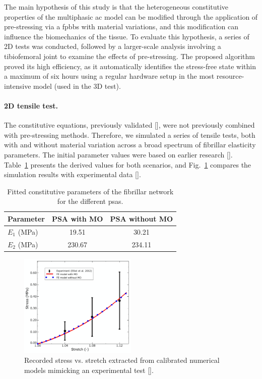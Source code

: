 \documentclass[12pt,a4paper]{report}
\begin{document}
The main hypothesis of this study is that the heterogeneous constitutive properties of the multiphasic \ac{ac} model can be modified through the application of  pre-stressing via a \ac{fpbbs} with material variations, and this modification can influence the biomechanics of the tissue. To evaluate this hypothesis, a series of 2D tests was conducted, followed by a larger-scale analysis involving a tibiofemoral joint to examine the effects of pre-stressing. The proposed algorithm proved its high efficiency, as it automatically identifies the stress-free state within a maximum of six hours using a regular hardware setup in the most resource-intensive model (used in the 3D test).

\paragraph{2D tensile test.} The constitutive equations, previously validated [\cite{sajjadinia2019}], were not previously combined with pre-stressing methods. Therefore, we simulated a series of tensile tests, both with and without material variation across a broad spectrum of fibrillar elasticity parameters. The initial parameter values were based on earlier research [\cite{wilson2007}]. Table~\ref{table:calibraion} presents the derived values for both scenarios, and Fig.~\ref{fig:calibration} compares the simulation results with experimental data [\cite{elliott2002}].
%
\begin{table}\centering
\caption{Fitted constitutive parameters of the fibrillar network for the different \acp{psa}.}
\label{table:calibraion}
\begin{tabular}{lcc}
\hline
\textbf{Parameter}  
& \textbf{PSA with MO}
& \textbf{PSA without MO}
\\
\hline
$E_1$ (MPa) 
& 19.51&    30.21 
\\
$E_2$ (MPa) & 230.67&    234.11 \\
\hline
\end{tabular}
\end{table}
%
\begin{figure}\centering
\includegraphics[width=0.5\textwidth]{img/calibration.jpg}
\caption{Recorded stress vs. stretch extracted from calibrated numerical models mimicking an experimental test [\cite{elliott2002}].}
\label{fig:calibration}
\end{figure}
\end{document}
